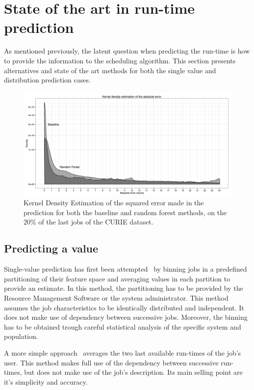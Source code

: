 \documentclass{article}
\begin{document}
\section{State of the art in run-time prediction}

As mentioned previously, the latent question when predicting the run-time is how to provide the information to the scheduling algorithm. This section presents alternatives and state of the art methods for both the single value and distribution prediction cases.

\begin{figure}[b]
  \centering
  \includegraphics[width=\textwidth]{error.png}
  \caption{Kernel Density Estimation of the squared error made in the prediction for both the baseline and random forest methods, on the 20\% of the last jobs of the CURIE dataset.}
    \label{fig:error}
  \end{figure}

  \subsection{Predicting a value}
  \label{sub:predicting_a_value}

  Single-value prediction has first been attempted~\cite{gibbons} by binning jobs in a predefined partitioning of their feature space and averaging values in each partition to provide an estimate. In this method, the partitioning has to be provided by the Resource Management Software or the system administrator. This method assumes the job characteristics to be identically distributed and independent. It does not make use of dependency between successive jobs. Moreover, the binning has to be obtained trough careful statistical analysis of the specific system and population.

  A more simple approach~\cite{tsafir} averages the two last available run-times of the job's user.
  This method makes full use of the dependency between successive run-times, but does not make use of the job's description. Its main selling point are it's simplicity and accuracy.
\end{document}
